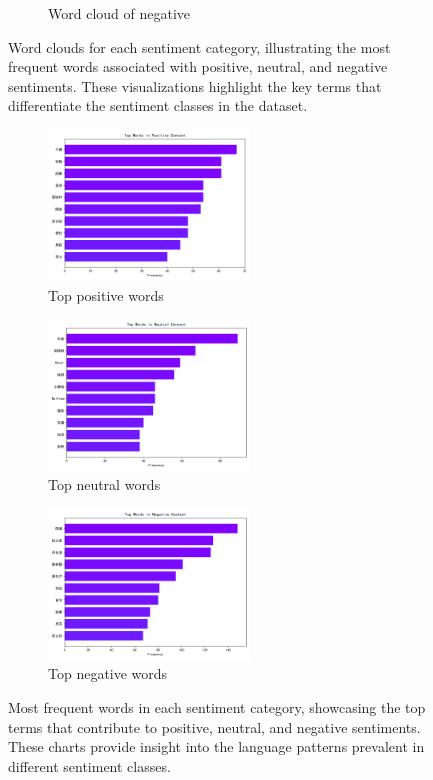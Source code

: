 \documentclass[12pt]{article}
\begin{document}
\begin{figure}[!ht]
\begin{subfigure}[b]{0.32\textwidth}
		\caption{Word cloud of negative}
	\end{subfigure}
	\caption{Word clouds for each sentiment category, illustrating the most frequent words associated with positive, neutral, and negative sentiments. These visualizations highlight the key terms that differentiate the sentiment classes in the dataset.}
	\label{fig:wordclouds}
\end{figure}

\begin{figure}[!ht]
	\centering
	\begin{subfigure}[b]{0.32\textwidth}
		\includegraphics[height=4cm]{top_words_positive.png}
		\caption{Top positive words}
	\end{subfigure}
	\hfill
	\begin{subfigure}[b]{0.32\textwidth}
		\includegraphics[height=4cm]{top_words_neutral.png}
		\caption{Top neutral words}
	\end{subfigure}
	\hfill
	\begin{subfigure}[b]{0.32\textwidth}
		\includegraphics[height=4cm]{top_words_negative.png}
		\caption{Top negative words}
	\end{subfigure}
	\caption{Most frequent words in each sentiment category, showcasing the top terms that contribute to positive, neutral, and negative sentiments. These charts provide insight into the language patterns prevalent in different sentiment classes.}
	\label{fig:top_words}
\end{figure}
\end{document}
